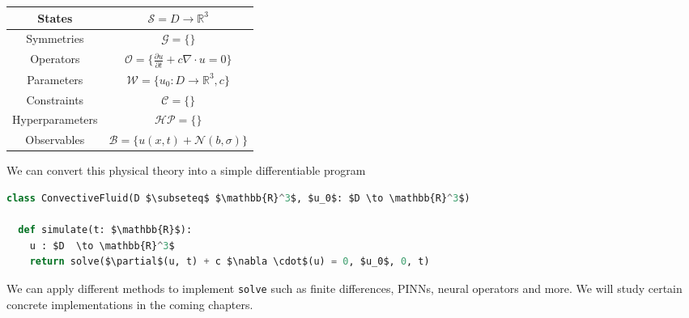 \documentclass[book.tex]{subfiles}
\begin{document}
\begin{center}
\begin{tabular}{|c|c|}
    \hline
    States & $\mathcal{S} = D \to \mathbb{R}^3 $ \\
    \hline
    Symmetries & $\mathcal{G} = \{\}$\\
    \hline
    Operators & $\mathcal{O} = \{ \frac{\partial u}{\partial t} + c \nabla \cdot u = 0\} $\\
    \hline
    Parameters & $\mathcal{W} = \{u_0: D \to \mathbb{R}^3, c\}$ \\
    \hline
    Constraints & $\mathcal{C} =  \{\}$ \\
    \hline
    Hyperparameters & $\mathcal{HP} = \{\}$  \\
    \hline
    Observables & $\mathcal{B} = \{u(x, t) + \mathcal{N}(b, \sigma) \}$  \\
    \hline
\end{tabular}
\label{phs:theory:static:particle}
\end{center}

We can convert this physical theory into a simple differentiable program 

\begin{lstlisting}[language=python]
class ConvectiveFluid(D $\subseteq$ $\mathbb{R}^3$, $u_0$: $D \to \mathbb{R}^3$)

  def simulate(t: $\mathbb{R}$):
    u : $D  \to \mathbb{R}^3$
    return solve($\partial$(u, t) + c $\nabla \cdot$(u) = 0, $u_0$, 0, t)
\end{lstlisting}

We can apply different methods to implement \lstinline{solve} such as finite differences, PINNs, neural operators and more. We will study certain concrete implementations in the coming chapters.
\end{document}
